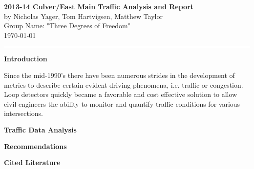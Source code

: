 \documentclass[12pt]{article}
\begin{document}

\Large
\noindent
\textbf{2013-14 Culver/East Main Traffic Analysis and Report}\\
\normalsize
by Nicholas Yager, Tom Hartvigsen, Matthew Taylor\\
Group Name: "Three Degrees of Freedom"\\
\today

\hrule
\vspace{2mm}

\noindent
\textbf{Introduction}

Since the mid-1990's there have been numerous strides in the development of metrics to describe certain evident driving phenomena, i.e. traffic or congestion. Loop detectors quickly became a favorable and cost effective solution to allow civil engineers the ability to monitor and quantify traffic conditions for various intersections. 

\noindent
\textbf{Traffic Data Analysis}



\noindent
\textbf{Recommendations}



\noindent
\textbf{Cited Literature}
\end{document}
